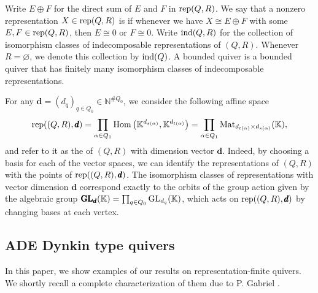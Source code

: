  Write $E \oplus F$ for the direct sum of $E$ and $F$ in $\operatorname{rep}(Q,R)$. We say that a nonzero representation $X \in \operatorname{rep}(Q,R)$ is  if whenever we have $X \cong E \oplus F$ with some $E,F \in \operatorname{rep}(Q,R)$, then $E \cong 0$ or $F \cong 0$. Write $\operatorname{ind}(Q,R)$ for the collection of isomorphism classes of indecomposable representations of $(Q,R)$. Whenever $R = \varnothing$, we denote this collection by $\operatorname{ind}(Q)$. A  bounded quiver is a bounded quiver that has finitely many isomorphism classes of indecomposable representations. 

 For any $\pmb{d} = (d_q)_{q \in Q_0} \in \mathbb{N}^{\#Q_0}$, we consider the following affine space
 \[\operatorname{rep}((Q,R),\pmb{d}) = \prod_{\alpha \in Q_1} \operatorname{Hom} \left(\mathbb{K}^{d_{s(\alpha)}}, \mathbb{K}^{d_{t(\alpha)}} \right) = \prod_{\alpha \in Q_1}  \operatorname{Mat}_{d_{t(\alpha)} \times d_{s(\alpha)}} (\mathbb{K}),\] and refer to it as the  of $(Q,R)$ with dimension vector $\pmb{d}$. Indeed, by choosing a basis for each of the vector spaces, we can identify the representations of $(Q,R)$ with the points of $\operatorname{rep}((Q,R), \pmb{d})$. The isomorphism classes of representations with vector dimension $\pmb{d}$ correspond exactly to the orbits of the group action given by the algebraic group $\pmb{\operatorname{GL}}_{\pmb{d}}(\mathbb{K}) = \prod_{q \in Q_0} \operatorname{GL}_{d_q}(\mathbb{K})$, which acts on $\operatorname{rep}((Q,R), \pmb{d})$ by changing bases at each vertex.

\subsection{ADE Dynkin type quivers}
\label{ss:Dynkin}

In this paper, we show examples of our results on representation-finite quivers. We shortly recall a complete characterization of them due to P. Gabriel \cite{G72}.

